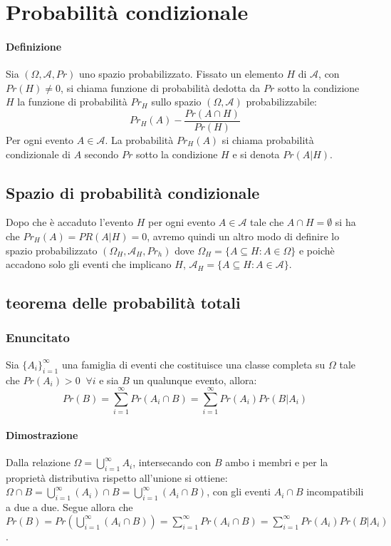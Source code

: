 \chapter{Probabilit\`a condizionale}
\subsubsection{Definizione}
Sia $(\Omega,\mathcal{A},Pr)$ uno spazio probabilizzato. Fissato un elemento $H$ di $\mathcal{A}$, con $Pr(H)\neq 0$, si chiama funzione di probabilit\`a dedotta 
da $Pr$ sotto la condizione $H$ la funzione di probabilit\`a $Pr_H$ sullo spazio $(\Omega,\mathcal{A})$ probabilizzabile:
\begin{equation}
Pr_H(A)-\dfrac{Pr(A\cap H)}{Pr(H)}
\end{equation}
Per ogni evento $A\in\mathcal{A}$. La probabilit\`a $Pr_H(A)$ si chiama probabilit\`a condizionale di $A$ secondo $Pr$ sotto la condizione $H$ e si denota $Pr(A|H)
$.
\section{Spazio di probabilit\`a condizionale}
Dopo che \`e accaduto l'evento $H$ per ogni evento $A\in\mathcal{A}$ tale che $A\cap H=\emptyset$ si ha che $Pr_H(A)=PR(A|H)=0$, avremo quindi un altro modo di 
definire lo spazio probabilizzato $(\Omega_H, \mathcal{A}_H, Pr_h)$ dove $\Omega_H=\{A\subseteq H:A\in\Omega\}$ e poich\`e accadono solo gli eventi che implicano 
$H$, $\mathcal{A}_H=\{A\subseteq H:A\in\mathcal{A}\}$. 
\section{teorema delle probabilit\`a totali}
\subsection{Enuncitato}
Sia $\{A_i\}_{i=1}^\infty$ una famiglia di eventi che costituisce una classe completa su $\Omega$ tale che $Pr(A_i)>0\;\;\forall i$ e sia $B$ un qualunque evento, 
allora:
\begin{equation}
Pr(B)=\sum\limits_{i=1}^\infty Pr(A_i\cap B)=\sum\limits_{i=1}^\infty Pr(A_i)Pr(B|A_i)
\end{equation}
\subsubsection{Dimostrazione}
Dalla relazione $\Omega=\bigcup\limits_{i=1}^\infty A_i$, intersecando con $B$ ambo i membri e per la propriet\`a distributiva rispetto all'unione si ottiene:
$\Omega\cap B=\bigcup\limits_{i=1}^\infty(A_i)\cap B=\bigcup\limits_{i=1}^\infty(A_i\cap B)$, con gli eventi $A_i\cap B$ incompatibili a due a due. Segue allora che
$Pr(B)=Pr(\bigcup\limits_{i=1}^\infty(A_i\cap B))=\sum\limits_{i=1}^\infty Pr(A_i\cap B)=\sum\limits_{i=1}^\infty Pr(A_i)Pr(B|A_i)$.
